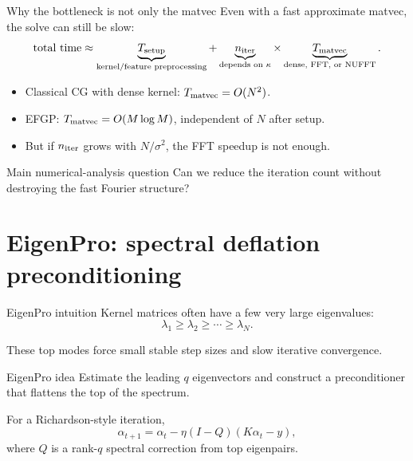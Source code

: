 \documentclass[aspectratio=169,10pt]{beamer}
\begin{document}
\begin{frame}{Why the bottleneck is not only the matvec}
Even with a fast approximate matvec, the solve can still be slow:
\[
\text{total time} \approx
\underbrace{T_{\rm setup}}_{\text{kernel/feature preprocessing}}+
\underbrace{n_{\rm iter}}_{\text{depends on }\kappa}
\times
\underbrace{T_{\rm matvec}}_{\text{dense, FFT, or NUFFT}}.
\]

\begin{itemize}
  \item Classical CG with dense kernel: $T_{\rm matvec}=O(N^2)$.
  \item EFGP: $T_{\rm matvec}=O(M\log M)$, independent of $N$ after setup.
  \item But if $n_{\rm iter}$ grows with $N/\sigma^2$, the FFT speedup is not enough.
\end{itemize}

\begin{block}{Main numerical-analysis question}
Can we reduce the iteration count without destroying the fast Fourier structure?
\end{block}
\end{frame}

\section{EigenPro: spectral deflation preconditioning}

\begin{frame}{EigenPro intuition}
Kernel matrices often have a few very large eigenvalues:
\[
\lambda_1 \ge \lambda_2 \ge \cdots \ge \lambda_N.
\]

These top modes force small stable step sizes and slow iterative convergence.

\begin{block}{EigenPro idea}
Estimate the leading $q$ eigenvectors and construct a preconditioner that flattens the top of the spectrum.
\end{block}

\vspace{0.4em}
For a Richardson-style iteration,
\[
\alpha_{t+1}=\alpha_t-\eta (I-Q)(K\alpha_t-y),
\]
where $Q$ is a rank-$q$ spectral correction from top eigenpairs.
\end{frame}
\end{document}
